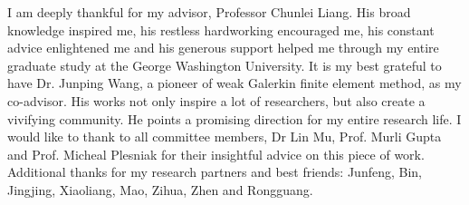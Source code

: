 \begin{acknowledgements}

I am deeply thankful for my advisor, Professor Chunlei Liang. His broad knowledge inspired me, his restless hardworking  encouraged me, his constant advice enlightened me and his generous support helped me through my entire graduate study at the George Washington University. It is my best grateful to have Dr. Junping Wang, a pioneer of weak Galerkin finite element method, as my co-advisor. His works not only inspire a lot of researchers, but also create a vivifying community. He points a promising direction for my entire research life. I would like to thank to all committee members, Dr Lin Mu, Prof. Murli Gupta and Prof. Micheal Plesniak for their insightful advice on this piece of work. Additional thanks for my research partners and best friends: Junfeng, Bin, Jingjing, Xiaoliang, Mao, Zihua, Zhen and Rongguang.

\end{acknowledgements}
